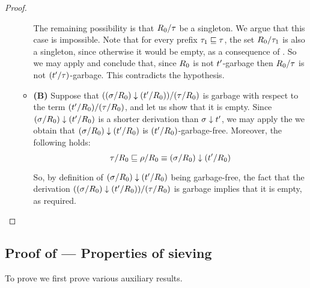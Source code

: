 \begin{proof}
\begin{itemize}
\begin{itemize}
    The remaining possibility is that $R_0/\tau$ be a singleton.
    We argue that this case is impossible.
    Note that for every prefix $\tau_1 \sqsubseteq \tau$,
    the set $R_0/\tau_1$ is also a singleton,
    since otherwise it would be empty, as a consequence of .
    So we may apply  and conclude that,
    since $R_0$ is not $t'$-garbage
    then $R_0/\tau$ is not $(t'/\tau)$-garbage.
    This contradicts the hypothesis.
  \item {\bf (B)}
    Suppose that $((\sigma/R_0) \downarrow (t'/R_0))/(\tau/R_0)$ is garbage
    with respect to the term $(t'/R_0)/(\tau/R_0)$, and let us show that it is empty.
    Since $(\sigma/R_0) \downarrow (t'/R_0)$
    is a shorter derivation than $\sigma \downarrow t'$,
    we may apply the \ih we obtain that
    $(\sigma/R_0) \downarrow (t'/R_0)$ is $(t'/R_0)$-garbage-free.
    Moreover, the following holds:
    \[\tau/R_0 \sqsubseteq \rho/R_0 \equiv (\sigma/R_0) \downarrow (t'/R_0)\]

    So, by definition of $(\sigma/R_0) \downarrow (t'/R_0)$
    being garbage-free,
    the fact that
    the derivation
    $((\sigma/R_0) \downarrow (t'/R_0))/(\tau/R_0)$ is garbage
    implies that it is empty, as required.
  \end{itemize}
\end{itemize}
\end{proof}
 


\subsection*{Proof of  --- Properties of sieving}
\label{properties_of_sieving_proof}
To prove  we first prove various auxiliary results.

